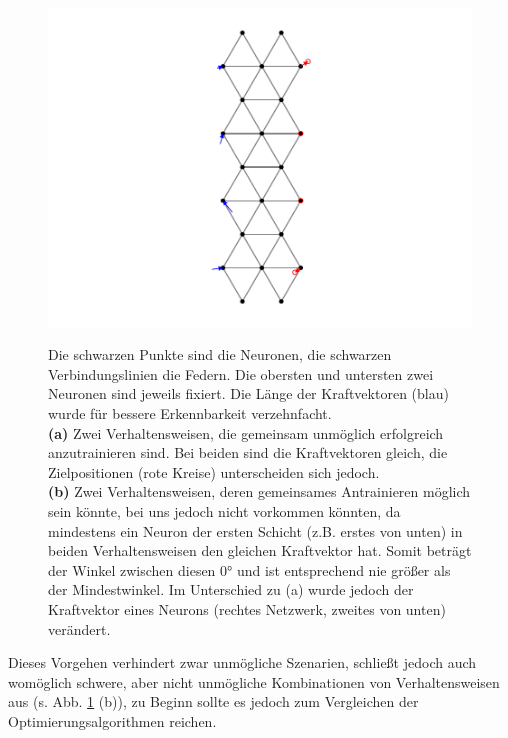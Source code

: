 \begin{figure}[htb]
{{    \includegraphics[trim=6cm 0.75cm 6cm 0.75cm, clip]{bilder/impossibleC.pdf}
    }
    }
    \caption{Die schwarzen Punkte sind die Neuronen, die schwarzen Verbindungslinien die Federn. Die obersten und untersten zwei Neuronen sind jeweils fixiert. Die Länge der Kraftvektoren (blau) wurde für bessere Erkennbarkeit verzehnfacht. \\
    \textbf{(a)} Zwei Verhaltensweisen, die gemeinsam unmöglich erfolgreich anzutrainieren sind. Bei beiden sind die Kraftvektoren gleich, die Zielpositionen (rote Kreise) unterscheiden sich jedoch. \\
    \textbf{(b)} Zwei Verhaltensweisen, deren gemeinsames Antrainieren möglich sein könnte, bei uns jedoch nicht vorkommen könnten, da mindestens ein Neuron der ersten Schicht (z.B. erstes von unten) in beiden Verhaltensweisen den gleichen Kraftvektor hat. Somit beträgt der Winkel zwischen diesen \ang{0} und ist entsprechend nie größer als der Mindestwinkel. Im Unterschied zu (a) wurde jedoch der Kraftvektor eines Neurons (rechtes Netzwerk, zweites von unten) verändert.}
    \label{fig:impossibletraining}
\end{figure}

Dieses Vorgehen verhindert zwar unmögliche Szenarien, schließt jedoch auch womöglich schwere, aber nicht unmögliche Kombinationen von Verhaltensweisen aus (s. Abb. \ref{fig:impossibletraining} (b)), 
zu Beginn sollte es jedoch zum Vergleichen der Optimierungsalgorithmen reichen.

